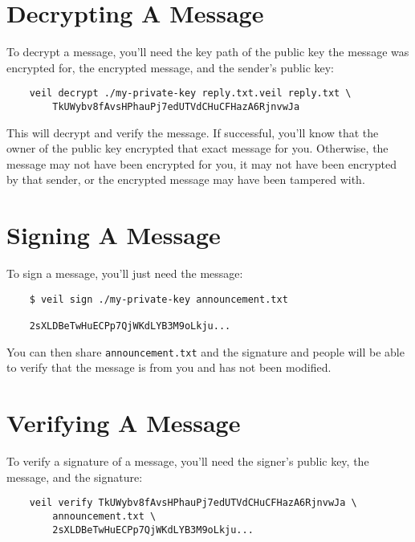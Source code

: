 \documentclass{scrartcl}
\begin{document}
    \section{Decrypting A Message}\label{sec:decrypting-a-message}

    To decrypt a message, you'll need the key path of the public key the message was encrypted for, the encrypted
    message, and the sender's public key:

    \begin{verbatim}
    veil decrypt ./my-private-key reply.txt.veil reply.txt \
        TkUWybv8fAvsHPhauPj7edUTVdCHuCFHazA6RjnvwJa
    \end{verbatim}

    This will decrypt and verify the message.
    If successful, you'll know that the owner of the public key encrypted that exact message for you.
    Otherwise, the message may not have been encrypted for you, it may not have been encrypted by that sender, or the
    encrypted message may have been tampered with.


    \section{Signing A Message}\label{sec:signing-a-message}

    To sign a message, you'll just need the message:

    \begin{verbatim}
    $ veil sign ./my-private-key announcement.txt

    2sXLDBeTwHuECPp7QjWKdLYB3M9oLkju...
    \end{verbatim}

    You can then share \texttt{announcement.txt} and the signature and people will be able to verify that the message is
    from you and has not been modified.


    \section{Verifying A Message}\label{sec:verifying-a-message}

    To verify a signature of a message, you'll need the signer's public key, the message, and the signature:

    \begin{verbatim}
    veil verify TkUWybv8fAvsHPhauPj7edUTVdCHuCFHazA6RjnvwJa \
        announcement.txt \
        2sXLDBeTwHuECPp7QjWKdLYB3M9oLkju...
    \end{verbatim}
\end{document}
